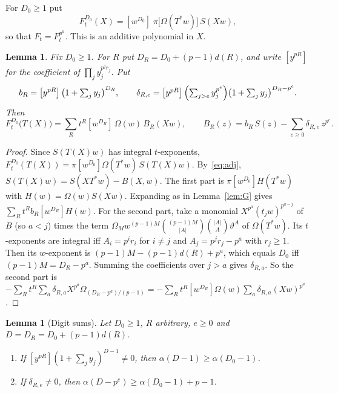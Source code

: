 \documentclass[11pt]{amsart}
\newtheorem{lemma}[theorem]{Lemma}
\theoremstyle{definition}
\theoremstyle{remark}
\newcommand{\coef}[1]{\left[#1\right]}
\begin{document}
For $D_0\ge1$ put
\[
  F^{D_0}_t(X)=\coef{w^{D_0}}\;\pi\bigl[\Omega(T^*w)\bigr]\,S(Xw),
\]
so that $F_t=F^{p^k}_t$.  This is an additive polynomial in $X$.

\begin{lemma}\label{lem:FT}
Fix $D_0\ge1$.  For $R$ put $D_R=D_0+(p-1)d(R)$, and write $\coef{y^{pR}}$ for the coefficient
of $\prod_jy_j^{p^jr_j}$.  Put
\[
  b_R=\coef{y^{pR}}\bigl(1+\textstyle\sum_jy_j\bigr)^{D_R},\qquad
  \delta_{R,e}=\coef{y^{pR}}\Bigl(\sum_{j>e}y_j^{p^e}\Bigr)\bigl(1+\textstyle\sum_jy_j\bigr)^{D_R-p^e}.
\]
Then
\[
  F^{D_0}_t\bigl(T(X)\bigr)=\sum_Rt^R\coef{w^{D_R}}\,\Omega(w)\,B_R(Xw),\qquad
  B_R(z)=b_R\,S(z)-\sum_{e\ge0}\delta_{R,e}\,z^{p^e}.
\]
\end{lemma}

\begin{proof}
Since $S(T(X)w)$ has integral $t$-exponents,
$F^{D_0}_t(T(X))=\pi\coef{w^{D_0}}\Omega(T^*w)\,S(T(X)w)$.
By~\eqref{eq:adj}, $S(T(X)w)=S(XT^*w)-B(X,w)$.  The first part is
$\pi\coef{w^{D_0}}H(T^*w)$ with $H(w)=\Omega(w)S(Xw)$.  Expanding as in
Lemma~\ref{lem:G} gives $\sum_Rt^Rb_R\coef{w^{D_R}}H(w)$.  For the second
part, take a monomial $X^{p^a}(t_jw)^{p^{a-j}}$ of $B$ (so $a<j$) times the
term $\Omega_M w^{(p-1)M}\binom{(p-1)M}{|A|}\binom{|A|}{A}\vartheta^A$ of
$\Omega(T^*w)$.  Its $t$-exponents are integral iff $A_i=p^ir_i$ for $i\ne j$
and $A_j=p^jr_j-p^a$ with $r_j\ge1$.  Then its $w$-exponent is
$(p-1)M-(p-1)d(R)+p^a$, which equals $D_0$ iff $(p-1)M=D_R-p^a$.  Summing the
coefficients over $j>a$ gives $\delta_{R,a}$.  So the second part is
$-\sum_Rt^R\sum_a\delta_{R,a}X^{p^a}\Omega_{(D_R-p^a)/(p-1)}=-\sum_Rt^R\coef{w^{D_R}}\Omega(w)\sum_a\delta_{R,a}(Xw)^{p^a}$.
\end{proof}

\begin{lemma}[Digit sums]\label{lem:digits}
Let $D_0\ge1$, $R$ arbitrary, $e\ge0$ and $D=D_R=D_0+(p-1)d(R)$.
\begin{enumerate}
\item If $\coef{y^{pR}}(1+\sum_jy_j)^{D-1}\ne0$, then $\alpha(D-1)\ge\alpha(D_0-1)$.
\item If $\delta_{R,e}\ne0$, then $\alpha(D-p^e)\ge\alpha(D_0-1)+p-1$.
\end{enumerate}
\end{lemma}
\end{document}
